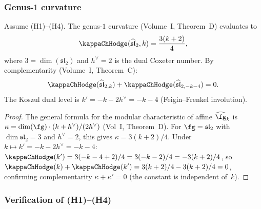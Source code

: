 \subsubsection{Genus-$1$ curvature}

\begin{proposition}
Assume \textrm{(H1)--(H4)}. The genus-$1$ curvature
(Volume~I, Theorem~D) evaluates to
\begin{equation}%
\kappaChHodge(\widehat{\mathfrak{sl}}_2, k) = \frac{3(k + 2)}{4},
\end{equation}
where $3 = \dim(\mathfrak{sl}_2)$ and $h^\vee = 2$ is the
dual Coxeter number. By complementarity (Volume~I, Theorem~C):
\begin{equation}
\kappaChHodge(\widehat{\mathfrak{sl}}_{2,k})
+ \kappaChHodge(\widehat{\mathfrak{sl}}_{2,-k-4}) = 0.
\end{equation}
The Koszul dual level is $k' = -k - 2h^\vee = -k - 4$
(Feigin--Frenkel involution).
\end{proposition}

\begin{proof}
The general formula for the modular characteristic of affine
$\widehat{\fg}_k$ is $\kappa = \dim(\fg)\cdot(k+h^\vee)/(2h^\vee)$
(Vol~I, Theorem~D). For $\fg = \mathfrak{sl}_2$
with $\dim\mathfrak{sl}_2 = 3$ and $h^\vee = 2$, this gives
$\kappa = 3(k+2)/4$.
Under $k \mapsto k' = -k - 2h^\vee = -k - 4$:
$\kappaChHodge(k') = 3(-k-4+2)/4 = 3(-k-2)/4 = -3(k+2)/4$,
so $\kappaChHodge(k) + \kappaChHodge(k') = 3(k+2)/4 - 3(k+2)/4 = 0$,
confirming complementarity $\kappa + \kappa' = 0$
(the constant is independent of~$k$).
\end{proof}

\subsubsection{Verification of (H1)--(H4)}

